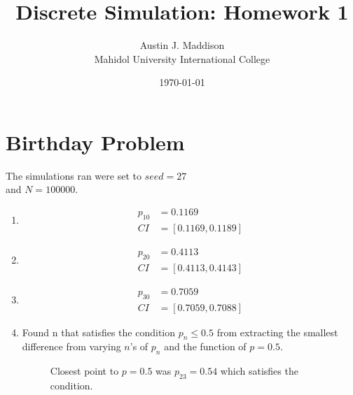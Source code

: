 \documentclass[twocolumn]{article}
\newcommand{\authorname}{Austin J. Maddison}
\begin{document}
\fontsize{9}{11.5}\selectfont %

\title{Discrete Simulation: Homework 1}
\author{\small \authorname \\ \small Mahidol University International College}
\date{\small \today}


%
\twocolumn[{
  \maketitle
}]

\section{Birthday Problem}

The simulations ran were set to $seed=27$ \\and $N=100000$.

\begin{enumerate}[label=\alph*)]
    
\item \begin{align*}
p_{10} &= 0.1169 \\
CI &= [0.1169, 0.1189]
\end{align*}
    
\item \begin{align*}
p_{20} &=  0.4113 \\
CI &= [0.4113, 0.4143]
\end{align*}

\item \begin{align*}
p_{30} &= 0.7059 \\
CI &= [0.7059, 0.7088]
\end{align*}


\item 
Found n that satisfies the condition $p_n \le 0.5$  from extracting the smallest difference from varying $n$'s of $p_n$ and the function of $p=0.5$.

	
\begin{figure}[H]
    \centering
    \caption{Closest point to $p=0.5$ was $p_{23}=0.54$ which satisfies the condition.}
    \label{fig:my_svg}
\end{figure}

\end{enumerate}
\end{document}
